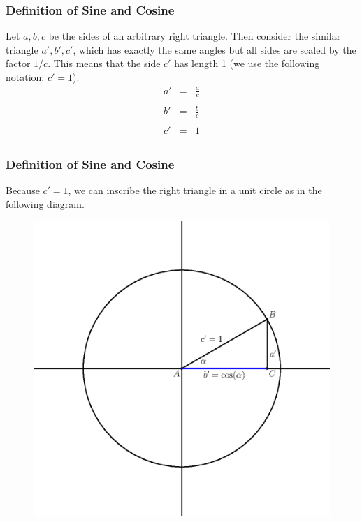 \documentclass[xcolor=dvipsnames]{beamer}
\begin{document}
\begin{frame}
  \frametitle{Definition of Sine and Cosine}
  Let $a,b,c$ be the sides of an arbitrary right triangle. Then
  consider the similar triangle $a',b',c'$, which has exactly the same
  angles but all sides are scaled by the factor $1/c$. This means that
  the side $c'$ has length 1 (we use the following notation: $c'=1$). 
\begin{equation}
  \label{eq:dioquite}
  \begin{array}{rcl}
    a'&=&\frac{a}{c} \\
    && \\
    b'&=&\frac{b}{c} \\
    && \\
    c'&=&1 \\
  \end{array}
\end{equation}
\end{frame}

\begin{frame}
  \frametitle{Definition of Sine and Cosine}
  Because $c'=1$, we can inscribe the right triangle in a unit circle
  as in the following diagram.
  \begin{figure}[h]
    \includegraphics[scale=.5]{./cosine.eps}
  \end{figure}
\end{frame}
\end{document}
